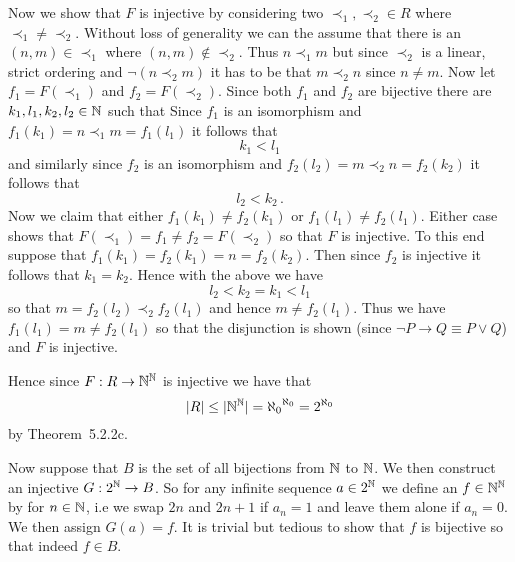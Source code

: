 \begin{solution}
    Now we show that $F$ is injective by considering two $\prec_1, \prec_2 \in R$ where $\prec_1 \neq \prec_2$.
    Without loss of generality we can the assume that there is an $(n,m) \in \prec_1$ where $(n,m) \notin \prec_2$.
    Thus $n \prec_1 m$ but since $\prec_2$ is a linear, strict ordering and $\lnot (n \prec_2 m)$ it has to be that $m \prec_2 n$ since $n \neq m$.
    Now let $f_1 = F(\prec_1)$ and $f_2 = F(\prec_2)$.
    Since both $f_1$ and $f_2$ are bijective there are $k_1,l_1,k_2,l_2 \in \mathbb{N}$ such that
    Since $f_1$ is an isomorphism and $f_1(k_1) = n \prec_1 m = f_1(l_1)$ it follows that
    $$
    k_1 < l_1
    $$
    and similarly since $f_2$ is an isomorphism and $f_2(l_2) = m \prec_2 n = f_2(k_2)$ it follows that
    $$
    l_2 < k_2 \,.
    $$
    Now we claim that either $f_1(k_1) \neq f_2(k_1)$ or $f_1(l_1) \neq f_2(l_1)$.
    Either case shows that $F(\prec_1) = f_1 \neq f_2 = F(\prec_2)$ so that $F$ is injective.
    To this end suppose that $f_1(k_1) = f_2(k_1) = n = f_2(k_2)$.
    Then since $f_2$ is injective it follows that $k_1 = k_2$.
    Hence with the above we have
    $$
    l_2 < k_2 = k_1 < l_1
    $$
    so that $m = f_2(l_2) \prec_2 f_2(l_1)$ and hence $m \neq f_2(l_1)$.
    Thus we have $f_1(l_1) = m \neq f_2(l_1)$ so that the disjunction is shown (since $\lnot P \to Q \equiv P \lor Q$) and $F$ is injective.

    Hence since $F: R \to \mathbb{N}^{\mathbb{N}}$ is injective we have that
    $$
    |R| \leq |\mathbb{N}^{\mathbb{N}}| = {\aleph_0}^{\aleph_0} = {2^{\aleph_0}}
    $$
    by Theorem~5.2.2c.

    Now suppose that $B$ is the set of all bijections from $\mathbb{N}$ to $\mathbb{N}$.
    We then construct an injective $G: 2^{\mathbb{N}} \to B$.
    So for any infinite sequence $a \in 2^{\mathbb{N}}$ we define an $f \in \mathbb{N}^{\mathbb{N}}$ by
    for $n \in \mathbb{N}$, i.e we swap $2n$ and $2n+1$ if $a_n = 1$ and leave them alone if $a_n = 0$.
    We then assign $G(a) = f$.
    It is trivial but tedious to show that $f$ is bijective so that indeed $f \in B$.


\end{solution}
